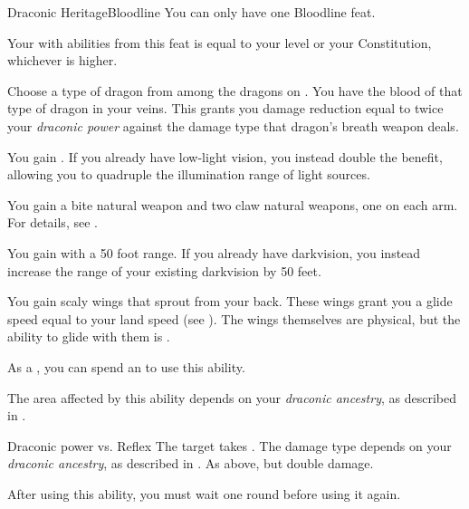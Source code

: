     \begin{feat}{Draconic Heritage}{Bloodline}
         You can only have one Bloodline feat.
        \featben

         Your  with abilities from this feat is equal to your level or your Constitution, whichever is higher.

         Choose a type of dragon from among the dragons on .
        You have the blood of that type of dragon in your veins.
        This grants you damage reduction equal to twice your \textit{draconic power} against the damage type that dragon's breath weapon deals.

         You gain .
        If you already have low-light vision, you instead double the benefit, allowing you to quadruple the illumination range of light sources.

         You gain a bite natural weapon and two claw natural weapons, one on each arm.
        For details, see .

         You gain  with a 50 foot range.
        If you already have darkvision, you instead increase the range of your existing darkvision by 50 feet.

         You gain scaly wings that sprout from your back.
        These wings grant you a glide speed equal to your land speed (see ).
        The wings themselves are physical, but the ability to glide with them is .

         As a , you can spend an  to use this ability.
        \begin{ability}
            \begin{spelltargetinginfo}
                \spellspecial The area affected by this ability depends on your \textit{draconic ancestry}, as described in .
            \end{spelltargetinginfo}
            \begin{spelleffects}
                \begin{spellattack}{Draconic power vs. Reflex}
                    \spellsuccess The target takes .
                    The damage type depends on your \textit{draconic ancestry}, as described in .
                    \spellcritical As above, but double damage.
                \end{spellattack}
                \spellspecial After using this ability, you must wait one round before using it again.
            \end{spelleffects}
        \end{ability}


\end{feat}
